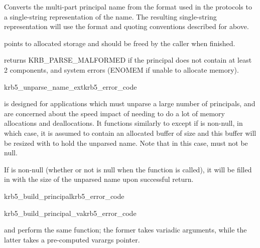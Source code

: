 Converts the multi-part principal name  from the
format used in the protocols to a single-string representation of the
name.  The resulting single-string representation will use the format
and quoting conventions described for 
above.

 points to allocated storage and should be freed by the caller
when finished.

 returns KRB_PARSE_MALFORMED if the principal
does not contain at least 2 components, and system errors (ENOMEM if
unable to allocate memory).

\begin{funcdecl}{krb5_unparse_name_ext}{krb5_error_code}{\funcin}
\funcinout
{}
\end{funcdecl}

 is designed for applications which
must unparse a large number of principals, and are concerned about the
speed impact of needing to do a lot of memory allocations and
deallocations.  It functions similarly to 
except if  is non-null, in which case, it is assumed
to contain an allocated buffer of size  and this
buffer will be resized with  to hold the unparsed
name.  Note that in this case,
 must not be null.  

If  is non-null (whether or not  is
null when the function is called), it will be filled in with the size
of the unparsed name upon successful return.

\begin{funcdecl}{krb5_build_principal}{krb5_error_code}{\funcout}
\funcin
{}
\end{funcdecl}
\begin{funcdecl}{krb5_build_principal_va}{krb5_error_code}{\funcout}
\funcin
{}
\end{funcdecl}

 and 
perform the same function; the former takes variadic arguments, while
the latter takes a pre-computed varargs pointer.

